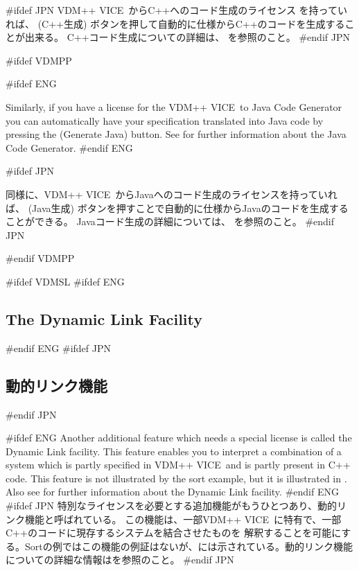 \documentclass[\pformat,12pt]{article}
\newcommand{\vdmslpp}{VDM-SL}
\newcommand{\vdmslpp}{VDM++}
\renewcommand{\vdmslpp}{VDM++ VICE}
\newcommand{\guicmd}[1]{{\sf #1}}
\newcommand{\guicmd}[1]{{\gt #1}}
\begin{document}
#ifdef JPN
\vdmslpp\ からC++へのコード生成のライセンス を持っていれば、 
(\guicmd{C++生成}) ボタンを押して自動的に仕様からC++のコードを生成することが出来る。
C++コード生成についての詳細は、
を参照のこと。
#endif JPN

#ifdef VDMPP

#ifdef ENG

Similarly, if you have a license  for the \vdmslpp\ to Java
Code Generator you can automatically have your specification
translated into Java code by pressing the 
(\guicmd{Generate Java}) button. See
\cite{CGJavaManPP-SCSK} for further information about the Java Code
Generator.
#endif ENG

#ifdef JPN

同様に、\vdmslpp\ からJavaへのコード生成のライセンスを持っていれば、
(\guicmd{Java生成}) ボタンを押すことで自動的に仕様からJavaのコードを生成することができる。
Javaコード生成の詳細については、\cite{CGJavaManPP-SCSK} を参照のこと。
#endif JPN

#endif VDMPP

#ifdef VDMSL
#ifdef ENG
\subsection{The Dynamic Link Facility}
#endif ENG
#ifdef JPN
\subsection{動的リンク機能}
#endif JPN

#ifdef ENG
Another additional feature which needs a special license
 is 
called the Dynamic Link facility. This feature
enables you to interpret a 
combination of a system which is partly specified in \vdmslpp\ and is
partly present in C++ code. This feature is not
illustrated by the sort example, but it is illustrated in
\cite{DLMan-SCSK}. Also see \cite{DLMan-SCSK}
for further information about the Dynamic Link facility.
#endif ENG
#ifdef JPN
特別なライセンスを必要とする追加機能がもうひとつあり、動的リンク機能と呼ばれている。
この機能は、一部\vdmslpp\ に特有で、一部C++のコードに現存するシステムを結合させたものを
解釈することを可能にする。Sortの例ではこの機能の例証はないが、\cite{DLMan-SCSK}には示されている。動的リンク機能
についての詳細な情報は\cite{DLMan-SCSK}を参照のこと。
#endif JPN
\end{document}
